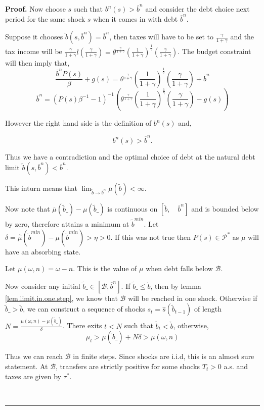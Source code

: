 \documentclass[thmsb,11pt]{article}
\newenvironment{proof}[1][Proof]{\noindent \textbf{#1.} }{\  \rule{0.5em}{0.5em}}
\begin{document}
\begin{proof}
Now choose $s$ such that $b^{n}(s)>\overline b^{n}$ and consider the debt choice next period for the same shock $s$ when it comes in with debt $\overline b^{n}$.


Suppose it chooses $\tilde{b}(s,\overline {b}^{n})=\overline b^{n}$, then taxes will have to be set to $\frac{\gamma}{1+\gamma}$ and the tax income will be $\frac{\gamma}{1+\gamma}l(\frac{\gamma}{1+\gamma})=\theta^{\frac{\gamma}{1+\gamma}}\left(\frac{1}{1+\gamma}\right)^{\frac{1}{\gamma}}\left(\frac{\gamma}{1+\gamma} \right)$. The budget constraint will then imply that,
\[\frac{\overline  b^{n} P(s)}{\beta}+g(s)=\theta^{\frac{\gamma}{1+\gamma}}\left(\frac{1}{1+\gamma}\right)^{\frac{1}{\gamma}}\left(\frac{\gamma}{1+\gamma} \right)+\overline b^{n}\]
\[\overline b^{n}=(P(s)\beta^{-1}-1)^{-1}\left(\theta^{\frac{\gamma}{1+\gamma}}\left(\frac{1}{1+\gamma}\right)^{\frac{1}{\gamma}}\left(\frac{\gamma}{1+\gamma}\right) -g(s)\right) \]

However the  right hand side is the definition of $b^{n}(s)$ and,

\[b^{n}(s)>\overline b^{n}.\]

Thus we have a contradiction and the optimal choice of debt at the natural debt limit $\tilde{b}(s,\overline {b}^{n})<\overline b^{n}$.

This inturn means that $\lim_{\tilde b\to \overline b^{n}}\overline \mu (\tilde b) <\infty$.


Now note that $\overline \mu(\tilde b\_)-\mu(\tilde b\_)$ is continuous on $[\check b, \quad \overline b^{n}]$ and is bounded below by zero, therefore attains a minimum at $\tilde b^{min}$. Let $\delta=\hat \mu(\tilde b^{min})-\mu(\tilde b^{min})>\eta>0$. If this was not true then $P(s)\in \mathcal {P}^*$ as $\mu$ will have an absorbing state.


Let $\mu(\omega,n)=\omega-n$. This is the value of $\mu$ when debt falls below $\mathcal{B}$.

Now consider any initial $\tilde b\_ \in [\mathcal{B},\overline b^{n}]$. If $\tilde{b}\_\leq \check b$, then by lemma \ref{lem.limit.in.one.step}, we know that $\mathcal{B}$ will be reached in one shock. Otherwise if $\tilde b\_>\check b$, we can construct a sequence of shocks $s_t=\hat s (\tilde b_{t-1})$ of length $N=\frac{\mu(\omega,n)-\mu(\tilde b\_)}{\delta}$. There exits $t<N$ such that $\tilde b_t<\check b$, otherwise,
\[\mu_t>\mu(\tilde b\_)+N\delta>\mu(\omega,n)\]

Thus we can reach $\mathcal{B}$ in finite steps. Since shocks are i.i.d, this is an almost sure statement. At $\mathcal{B}$, transfers are strictly positive for some shocks $T_t>0$ a.s. and taxes are given by $\tau^*$.





\end{proof}
\end{document}
